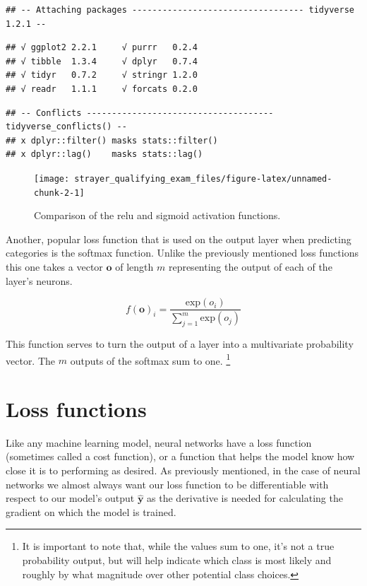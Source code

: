 \documentclass[]{book}
\let\rmarkdownfootnote\footnote%
\def\footnote{\protect\rmarkdownfootnote}
\theoremstyle{definition}
\theoremstyle{definition}
\theoremstyle{definition}
\theoremstyle{remark}
\let\BeginKnitrBlock\begin \let\EndKnitrBlock\end
\begin{document}
\begin{verbatim}
## -- Attaching packages ---------------------------------- tidyverse 1.2.1 --
\end{verbatim}

\begin{verbatim}
## √ ggplot2 2.2.1     √ purrr   0.2.4
## √ tibble  1.3.4     √ dplyr   0.7.4
## √ tidyr   0.7.2     √ stringr 1.2.0
## √ readr   1.1.1     √ forcats 0.2.0
\end{verbatim}

\begin{verbatim}
## -- Conflicts ------------------------------------- tidyverse_conflicts() --
## x dplyr::filter() masks stats::filter()
## x dplyr::lag()    masks stats::lag()
\end{verbatim}

\begin{figure}

{\centering \texttt{[image: strayer\_qualifying\_exam\_files/figure-latex/unnamed-chunk-2-1]} 

}

\caption{Comparison of the relu and sigmoid activation functions.}\label{fig:unnamed-chunk-2}
\end{figure}

Another, popular loss function that is used on the output layer when
predicting categories is the softmax function. Unlike the previously
mentioned loss functions this one takes a vector \(\textbf{o}\) of
length \(m\) representing the output of each of the layer's neurons.

\BeginKnitrBlock{definition}[Softmax activation function.]
\protect\hypertarget{def:softmax}{}{\label{def:softmax} {}
}\[f(\textbf{o})_i = \frac{\text{exp}(o_i)}{\sum_{j = 1}^m \text{exp}(o_j)}\]
\EndKnitrBlock{definition}

This function serves to turn the output of a layer into a multivariate
probability vector. The \(m\) outputs of the softmax sum to one.
\footnote{It is important to note that, while the values sum to one,
  it's not a true probability output, but will help indicate which class
  is most likely and roughly by what magnitude over other potential
  class choices.}

\section{Loss functions}\label{loss-functions}

Like any machine learning model, neural networks have a loss function
(sometimes called a cost function), or a function that helps the model
know how close it is to performing as desired. As previously mentioned,
in the case of neural networks we almost always want our loss function
to be differentiable with respect to our model's output
\(\hat{\textbf{y}}\) as the derivative is needed for calculating the
gradient on which the model is trained.
\end{document}
